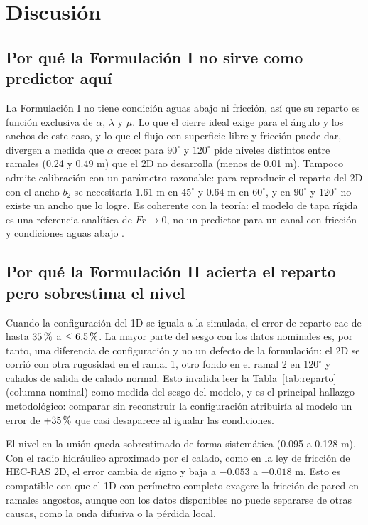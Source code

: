 \section{Discusión}\label{sec:discusion}
\subsection{Por qué la Formulación I no sirve como predictor aquí}
La Formulación I no tiene condición aguas abajo ni fricción, así que su reparto es función exclusiva de $\alpha$, $\lambda$ y $\mu$. Lo que el cierre ideal exige para el ángulo y los anchos de este caso, y lo que el flujo con superficie libre y fricción puede dar, divergen a medida que $\alpha$ crece: para $90^\circ$ y $120^\circ$ pide niveles distintos entre ramales (0.24 y 0.49 m) que el 2D no desarrolla (menos de 0.01 m). Tampoco admite calibración con un parámetro razonable: para reproducir el reparto del 2D con el ancho $b_2$ se necesitaría $1.61$ m en $45^\circ$ y $0.64$ m en $60^\circ$, y en $90^\circ$ y $120^\circ$ no existe un ancho que lo logre. Es coherente con la teoría: el modelo de tapa rígida es una referencia analítica de $Fr\to0$, no un predictor para un canal con fricción y condiciones aguas abajo \citep{batchelor1967,milnethomson1962}.

\subsection{Por qué la Formulación II acierta el reparto pero sobrestima el nivel}
Cuando la configuración del 1D se iguala a la simulada, el error de reparto cae de hasta $35\text{\thinspace\%}$ a $\leq6.5\text{\thinspace\%}$. La mayor parte del sesgo con los datos nominales es, por tanto, una diferencia de configuración y no un defecto de la formulación: el 2D se corrió con otra rugosidad en el ramal 1, otro fondo en el ramal 2 en $120^\circ$ y calados de salida de calado normal. Esto invalida leer la Tabla~\ref{tab:reparto} (columna nominal) como medida del sesgo del modelo, y es el principal hallazgo metodológico: comparar sin reconstruir la configuración atribuiría al modelo un error de $+35\text{\thinspace\%}$ que casi desaparece al igualar las condiciones.

El nivel en la unión queda sobrestimado de forma sistemática (0.095 a 0.128 m). Con el radio hidráulico aproximado por el calado, como en la ley de fricción de HEC-RAS 2D, el error cambia de signo y baja a $-0.053$ a $-0.018$ m. Esto es compatible con que el 1D con perímetro completo exagere la fricción de pared en ramales angostos, aunque con los datos disponibles no puede separarse de otras causas, como la onda difusiva o la pérdida local.

